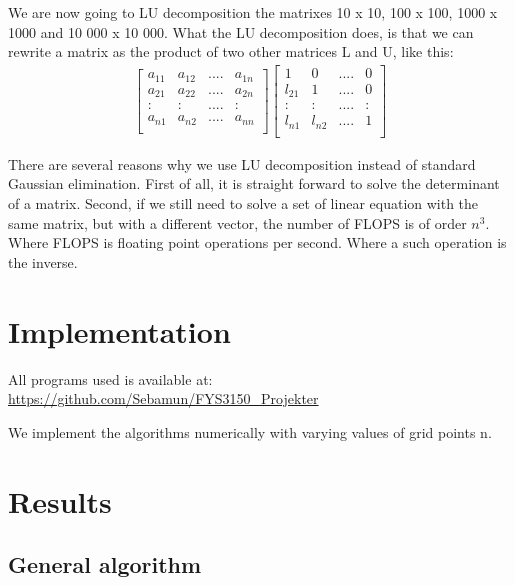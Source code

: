 \documentclass[norsk,a4paper,12pt]{article}
\begin{document}
We are now going to LU decomposition the matrixes 10 x 10, 100 x 100, 1000 x 1000 and 10 000 x 10 000. What the LU decomposition does, is that we can rewrite a matrix as the product of two other matrices L and U, like this:
\begin{align*}
\begin{bmatrix}
a_{11} & a_{12} & .... & a_{1n} \\
a_{21} & a_{22} & .... & a_{2n} \\
: & :& .... & : \\
a_{n1} & a_{n2} & .... & a_{nn} \\
\end{bmatrix}
\begin{bmatrix}
1 & 0 & .... & 0 \\
l_{21} & 1 & .... & 0 \\
: & :& .... & : \\
l_{n1} & l_{n2} & .... & 1\\
\end{bmatrix}
\end{align*}





There are several reasons why we use LU decomposition instead of standard Gaussian elimination. First of all, it is straight forward to solve the determinant of a matrix. Second, if we still need to solve a set of linear equation with the same matrix, but with a different vector, the number of FLOPS is of order $n^3$. Where FLOPS is floating point operations per second. Where a such operation is the inverse. 




\section{Implementation}

All programs used is available at: \\
\url{https://github.com/Sebamun/FYS3150_Projekter}

We implement the algorithms numerically with varying values of grid points n. 

\section{Results}

\subsection{General algorithm}
\end{document}
